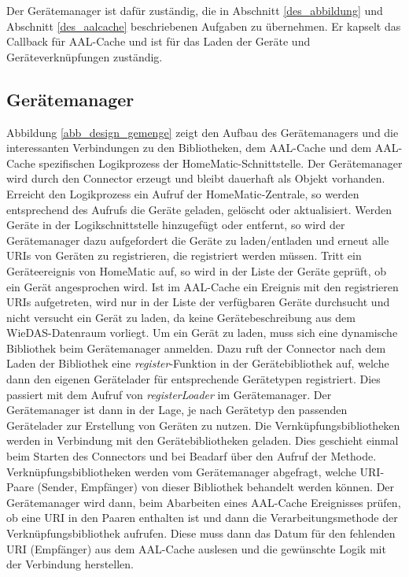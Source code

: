 Der Gerätemanager ist dafür zuständig, die in Abschnitt \ref{des_abbildung} und Abschnitt \ref{des_aalcache}
beschriebenen Aufgaben zu übernehmen.
Er kapselt das Callback für AAL-Cache und ist für das Laden der Geräte und Geräteverknüpfungen zuständig.

\subsection{Gerätemanager}
\label{des_gemenge}


Abbildung \ref{abb_design_gemenge} zeigt den Aufbau des Gerätemanagers und die interessanten Verbindungen zu den
Bibliotheken, dem AAL-Cache und dem AAL-Cache spezifischen Logikprozess der HomeMatic-Schnittstelle.
Der Gerätemanager wird durch den Connector erzeugt und bleibt dauerhaft als Objekt vorhanden.
Erreicht den Logikprozess ein Aufruf der HomeMatic-Zentrale, so werden entsprechend des Aufrufs die Geräte
geladen, gelöscht oder aktualisiert.
Werden Geräte in der Logikschnittstelle hinzugefügt oder entfernt, so wird der Gerätemanager dazu aufgefordert
die Geräte zu laden/entladen und erneut alle URIs von Geräten zu registrieren, die registriert werden müssen.
Tritt ein Geräteereignis von HomeMatic auf, so wird in der Liste der Geräte geprüft, ob ein Gerät angesprochen wird.
Ist im AAL-Cache ein Ereignis mit den registrieren URIs aufgetreten, wird nur in der Liste der verfügbaren Geräte
durchsucht und nicht versucht ein Gerät zu laden, da keine Gerätebeschreibung aus dem WieDAS-Datenraum vorliegt.
Um ein Gerät zu laden, muss sich eine dynamische Bibliothek beim Gerätemanager anmelden.
Dazu ruft der Connector nach dem Laden der Bibliothek eine \emph{register}-Funktion in der
Gerätebibliothek auf, welche dann den eigenen Gerätelader für entsprechende Gerätetypen registriert.
Dies passiert mit dem Aufruf von \emph{registerLoader} im Gerätemanager.
Der Gerätemanager ist dann in der Lage, je nach Gerätetyp den passenden Gerätelader zur Erstellung
von Geräten zu nutzen.
Die Vernküpfungsbibliotheken werden in Verbindung mit den Gerätebibliotheken geladen.
Dies geschieht einmal beim Starten des Connectors und bei Beadarf über den Aufruf der Methode.
Verknüpfungsbibliotheken werden vom Gerätemanager abgefragt, welche URI-Paare (Sender, Empfänger)
von dieser Bibliothek behandelt werden können.
Der Gerätemanager wird dann, beim Abarbeiten eines AAL-Cache Ereignisses prüfen, ob eine URI
in den Paaren enthalten ist und dann die Verarbeitungsmethode der Verknüpfungsbibliothek aufrufen.
Diese muss dann das Datum für den fehlenden URI (Empfänger) aus dem AAL-Cache auslesen und die gewünschte
Logik mit der Verbindung herstellen.

